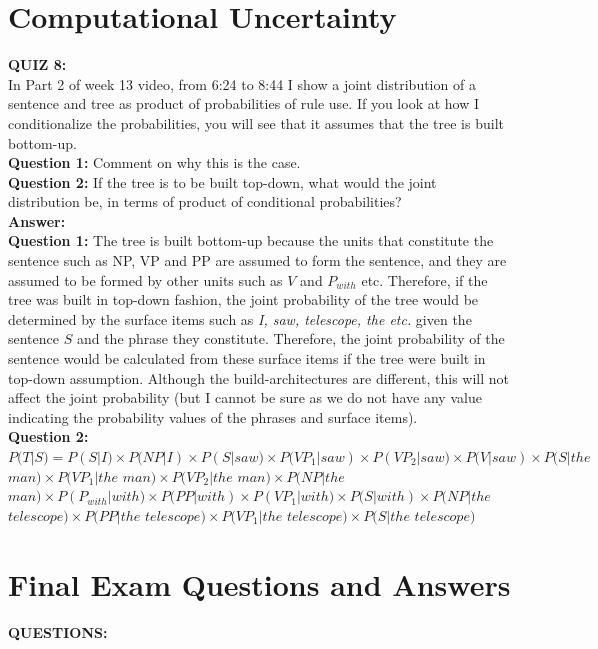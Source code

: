 \documentclass[12pt,a4paper]{article}
\begin{document}
\clearpage

\section{Computational Uncertainty}
\noindent \textbf{\Large{QUIZ 8:}}\\
In Part 2 of week 13 video, from 6:24 to 8:44 I show a joint distribution of a sentence and tree as product of probabilities of rule use. If you look at how I conditionalize the probabilities, you will see that it assumes that the tree is built bottom-up.\\

\noindent \textbf{Question 1:} Comment on why this is the case.\\
\noindent \textbf{Question 2:} If the tree is to be built top-down, what would the joint distribution be, in terms of product of conditional probabilities?\\

\noindent \textbf{\Large{Answer:}}\\

\noindent \textbf{Question 1:} The tree is built bottom-up because the units that constitute the sentence such as NP, VP and PP are assumed to form the sentence, and they are assumed to be formed by other units such as $V$ and $P_{with}$ etc. Therefore, if the tree was built in top-down fashion, the joint probability of the tree would be determined by the surface items such as \textit{I, saw, telescope, the etc.} given the sentence $S$ and the phrase they constitute. Therefore, the joint probability of the sentence would be calculated from these surface items if the tree were built in top-down assumption. Although the build-architectures are different, this will not affect the joint probability (but I cannot be sure as we do not have any value indicating the probability values of the phrases and surface items).\\

\noindent \textbf{Question 2:} $P(T|S)=P(S|I)\times P(NP|I)\times P(S|saw)\times P(VP_{1}|saw)\times P(VP_{2}|saw)\times P(V|saw)\times P(S|the$ $man)\times P(VP_{1}|the$ $man)\times P(VP_{2}|the$ $man)\times P(NP|the$ $man)\times P(P_{with}|with)\times P(PP|with)\times P(VP_{1}|with)\times P(S|with)\times P(NP|the$ $telescope)\times P(PP|the$ $telescope)\times P(VP_{1}|the$ $telescope)\times P(S|the$ $telescope)$

\clearpage

\section{Final Exam Questions and Answers}
\textbf{QUESTIONS:}\\
\end{document}
